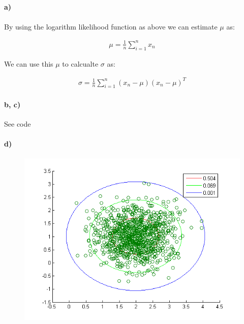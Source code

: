 \documentclass{article}
\begin{document}
\setcounter{section}{2}
\setcounter{subsection}{0}
\subsection{}
\paragraph{a)}

By using the logarithm likelihood function as above we can estimate $\mu$ as:

\begin{align}
  \mu = \frac{1}{n} \sum_{i = 1}^{n} x_n
\end{align}

We can use this $\mu$ to calcualte $\sigma$ as:

\begin{align}
  \sigma = \frac{1}{n} \sum_{i = 1}^{n} (x_n - \mu)(x_n - \mu)^T
\end{align}

\paragraph{b, c)}
See code

\paragraph{d)}
\begin{figure}[H]
\centering
\includegraphics[scale=0.7]{Fig21.png}
\end{figure}
\end{document}
